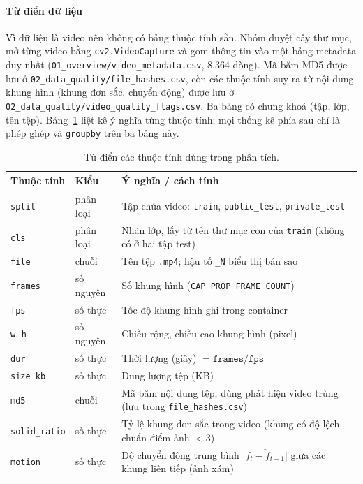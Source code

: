 \paragraph{Từ điển dữ liệu} Vì dữ liệu là video nên không có bảng thuộc tính sẵn. Nhóm duyệt cây thư mục, mở từng video bằng \texttt{cv2.VideoCapture} và gom thông tin vào một bảng metadata duy nhất (\texttt{01\_overview/video\_metadata.csv}, 8.364 dòng). Mã băm MD5 được lưu ở \texttt{02\_data\_quality/file\_hashes.csv}, còn các thuộc tính suy ra từ nội dung khung hình (khung đơn sắc, chuyển động) được lưu ở \texttt{02\_data\_quality/video\_quality\_flags.csv}. Ba bảng có chung khoá (tập, lớp, tên tệp). Bảng~\ref{tab:eda_dict} liệt kê ý nghĩa từng thuộc tính; mọi thống kê phía sau chỉ là phép ghép và \texttt{groupby} trên ba bảng này.

\begin{table}[H]
  \centering
  \caption{Từ điển các thuộc tính dùng trong phân tích.}
  \label{tab:eda_dict}
  \small
  \begin{tabular}{@{}p{}p{}p{}@{}}
    \toprule
    \textbf{Thuộc tính} & \textbf{Kiểu} & \textbf{Ý nghĩa / cách tính} \\
    \midrule
    \texttt{split}        & phân loại & Tập chứa video: \texttt{train}, \texttt{public\_test}, \texttt{private\_test} \\
    \texttt{cls}          & phân loại & Nhãn lớp, lấy từ tên thư mục con của \texttt{train} (không có ở hai tập test) \\
    \texttt{file}         & chuỗi     & Tên tệp \texttt{.mp4}; hậu tố \texttt{\_N} biểu thị bản sao \\
    \texttt{frames}       & số nguyên & Số khung hình (\texttt{CAP\_\allowbreak PROP\_\allowbreak FRAME\_\allowbreak COUNT}) \\
    \texttt{fps}          & số thực   & Tốc độ khung hình ghi trong container \\
    \texttt{w}, \texttt{h}& số nguyên & Chiều rộng, chiều cao khung hình (pixel) \\
    \texttt{dur}          & số thực   & Thời lượng (giây) $=\texttt{frames}/\texttt{fps}$ \\
    \texttt{size\_kb}     & số thực   & Dung lượng tệp (KB) \\
    \texttt{md5}          & chuỗi     & Mã băm nội dung tệp, dùng phát hiện video trùng (lưu trong \texttt{file\_hashes.csv}) \\
    \texttt{solid\_ratio} & số thực   & Tỷ lệ khung đơn sắc trong video (khung có độ lệch chuẩn điểm ảnh $<3$) \\
    \texttt{motion}       & số thực   & Độ chuyển động trung bình $\overline{|f_t-f_{t-1}|}$ giữa các khung liên tiếp (ảnh xám) \\
    \bottomrule
  \end{tabular}
\end{table}

